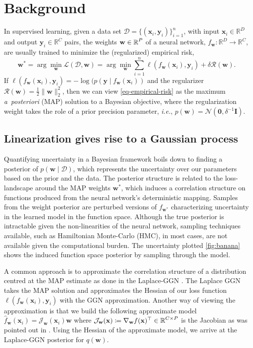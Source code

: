 \documentclass{article}
\makeatletter
\newcommand{\ie}{\textit{i.e.\@}\xspace}
\newcommand{\dataset}{\ensuremath{\mathcal{D}}}
\newcommand{\inputDomain}{\ensuremath{\mathbb{R}^{D}}}
\newcommand{\outputDomain}{\ensuremath{\mathbb{R}^{C}}}
\newcommand{\weights}{\ensuremath{\mathbf{w}}}
\newcommand{\mbf}[1]{\mathbf{#1}}
\newcommand{\MI}{\mbf{I}}
\newcommand{\vzeros}{\mbf{0}}
\newcommand{\vw}{\mbf{w}}
\newcommand{\Jac}[2]{\mathcal{J}_{#1}(#2)}
\newcommand{\Norm}{\mathcal{N}}
\makeatother
\begin{document}
\section{Background}
\label{sec:methods}
%
In supervised learning, given a data set $\dataset = \{(\mathbf{x}_{i} , \mathbf{y}_{i})\}_{i=1}^{n}$, with input $\mathbf{x}_i \in \inputDomain$ and output $\mathbf{y}_i \in \outputDomain$ pairs, the weights $\weights \in \R^{P}$ of a neural network, $f_\mathbf{w} : \inputDomain \to \outputDomain$, are usually trained to minimize the (regularized) empirical risk,
%
\begin{equation} \label{eq-empirical-risk}
  \weights^{*} = 
  \arg \min_{\weights} \mathcal{L}(\dataset,\weights) =
  \arg \min_{\weights} \sum_{i=1}^{n} \ell(f_\weights(\mathbf{x}_{i}), \mathbf{y}_i) + \delta \mathcal{R}(\weights).
\end{equation}
%
If $\ell(f_\weights(\mathbf{x}_{i}), \mathbf{y}_i) = -\log(p(\mathbf{y} \mid f_\weights(\mathbf{x}_{i}))$ and the regularizer $\mathcal{R}(\weights) = \frac{1}{2}\|\weights\|^{2}_2$, then we can view \cref{eq-empirical-risk} as the maximum {\it a~posteriori} (MAP) solution to a Bayesian objective, where the regularization weight takes the role of a prior precision parameter, \ie, $p(\vw) = \Norm(\vzeros, \delta^{-1} \MI)$.

%
\subsection{Linearization gives rise to a Gaussian process} 
\label{sec:nn2gp}
%
Quantifying uncertainty in a Bayesian framework boils down to finding a posterior of $p(\vw \mid \dataset)$, which represents the uncertainty over our parameters based on the prior and the data. The posterior structure is related to the loss-landscape around the MAP weights $\vw^*$, which induces a correlation structure on functions produced from the neural network's deterministic mapping. Samples from the weight posterior are perturbed versions of $f_{\vw^*}$ characterizing uncertainty in the learned model in the function space. Although the true posterior is intractable given the non-linearities of the neural network, sampling techniques available, such as Hamiltonian Monte-Carlo (HMC), in most cases, are not available given the computational burden.
 The uncertainty plotted \cref{fig:banana} shows the induced function space posterior by sampling through the model.

A common approach is to approximate the correlation structure of a distribution centred at the MAP estimate as done in the Laplace-GGN \citep{khan2019approximate, daxberger2021laplace, maddox2021fast}. The Laplace GGN takes the MAP solution and approximates the Hessian of our loss function  $\ell(f_\weights(\mathbf{x}_{i}), \mathbf{y}_i)$ with the GGN approximation. Another way of viewing the approximation is that we build the following approximate model $\hat{f}_\weights(\mathbf{x}_{i}) = \Jac{\weights}{\mathbf{x}_i} \vw $  where $\Jac{\weights}{\mathbf{x}} \coloneqq \nabla_\weights f(\mathbf{x})^\top \in \R^{C \times P}$ is the Jacobian as was pointed out in \citep{khan2019approximate}. Using the Hessian of the approximate model, we arrive at the Laplace-GGN posterior for $q(\vw)$.
\end{document}
